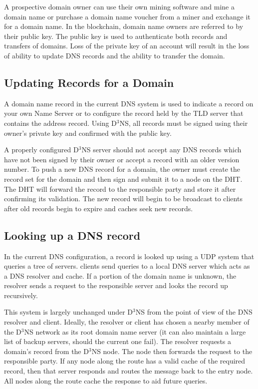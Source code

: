 A prospective domain owner can use their own mining software and mine a domain name or purchase a domain name voucher from a miner and exchange it for a domain name. In the blockchain, domain name owners are referred to by their public key. The public key is used to authenticate both records and transfers of domains. Loss of the private key of an account will result in the loss of ability to update DNS records and the ability to transfer the domain. 


\subsection{Updating Records for a Domain}
A domain name record in the current DNS system is used to indicate a record on your own Name Server or to configure the record held by the TLD server that contains the address record. Using D$^3$NS, all records must be signed using their owner's private key and confirmed with the public key. 

A properly configured D$^3$NS server should not accept any DNS records which have not been signed by their owner or accept a record with an older version number. To push a new DNS record for a domain, the owner must create the record set for the domain and then sign and submit it to a node on the DHT. The DHT will forward the record to the responsible party and store it after confirming its validation. The new record will begin to be broadcast to clients after old records begin to expire and caches seek new records.

\subsection{Looking up a DNS record}
In the current DNS configuration, a record is looked up using a UDP system that queries a tree of servers. clients send queries to  a local DNS server which acts as a DNS resolver and cache. If a portion of the domain name is unknown, the resolver sends a request to the responsible server and looks the record up recursively.

This system is largely unchanged under D$^{3}$NS from the point of view of the DNS resolver and client. Ideally, the resolver or client has chosen a nearby member of the D$^{3}$NS network as its root domain name server (it can also maintain a large list of backup servers, should the current one fail). The resolver requests a domain's record from the D$^{3}$NS node. The node then forwards the request to the responsible party. If any node along the route has a valid cache of the required record, then that server responds and routes the message back to the entry node. All nodes along the route cache the response to aid future queries.

